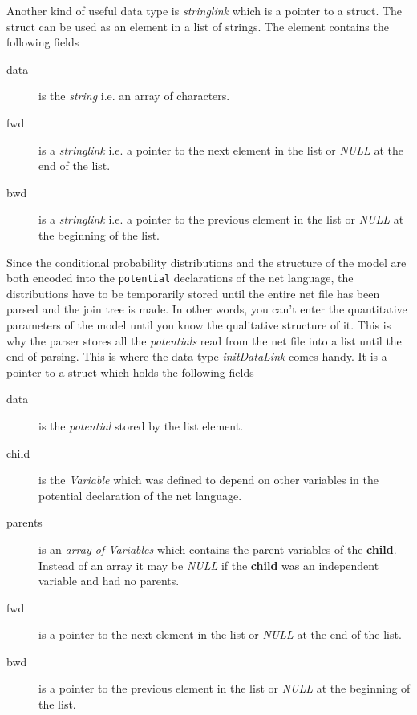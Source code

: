 \documentclass[12pt,a4paper]{report}
\newcommand{\cdatatype}[1]{{\it #1}}
\newcommand{\examplecode}[1]{\texttt{#1}}
\newcommand{\cstructfield}[1]{\textbf{#1}}
\begin{document}
Another kind of useful data type is \cdatatype{stringlink} which is a
pointer to a struct. The struct can be used as an element in a list of
strings. The element contains the following fields
\begin{description}
\item[data] is the \cdatatype{string} i.e. an array of characters.

\item[fwd] is a \cdatatype{stringlink} i.e. a pointer to the next element in
the list or \cdatatype{NULL} at the end of the list.

\item[bwd] is a \cdatatype{stringlink} i.e. a pointer to the previous
element in the list or \cdatatype{NULL} at the beginning of the list.
\end{description}

Since the conditional probability distributions and the structure of
the model are both encoded into the \examplecode{potential}
declarations of the net language, the distributions have to be 
temporarily stored until the entire net file has been parsed and the 
join tree is made. In other words, you can't enter the quantitative 
parameters of the model until you know the qualitative structure of
it. This is why the parser stores all the \cdatatype{potentials} read 
from the net file into a list until the end of parsing. This is where 
the data type \cdatatype{initDataLink} comes handy. It is a pointer to
a struct which holds the following fields
\begin{description}
\item[data] is the \cdatatype{potential} stored by the list element.

\item[child] is the \cdatatype{Variable} which was defined to depend on
other variables in the potential declaration of the net language.

\item[parents] is an \cdatatype{array of Variables} which contains the
parent variables of the \cstructfield{child}. Instead of an array it 
may be \cdatatype{NULL} if the \cstructfield{child} was an independent
variable and had no parents.

\item[fwd] is a pointer to the next element in the list or 
\cdatatype{NULL} at the end of the list.

\item[bwd] is a pointer to the previous element in the list or 
\cdatatype{NULL} at the beginning of the list.
\end{description}
\end{document}
